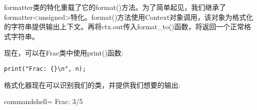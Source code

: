 formatter类的特化重载了它的format()方法。为了简单起见，我们继承了formatter<unsigned>特化。format()方法使用Context对象调用，该对象为格式化的字符串提供输出上下文。再将ctx.out传入format\_to()函数，将返回一个正常格式字符串。

现在，可以在Frac类中使用print()函数:

\begin{lstlisting}[style=styleCXX]
print("Frac: {}\n", n);
\end{lstlisting}

格式化器现在可以识别我们的类，并提供我们想要的输出:

\begin{tcblisting}{commandshell={}}
Frac: 3/5
\end{tcblisting}






